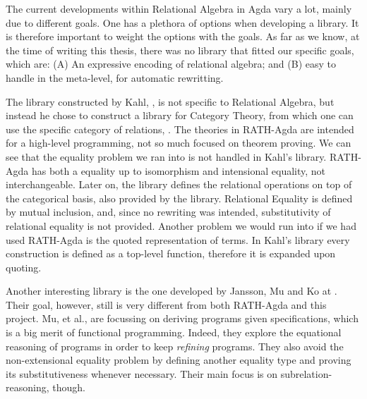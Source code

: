 The current developments within Relational Algebra in Agda vary a lot, mainly due to
different goals. One has a plethora of options when developing a library. It is therefore
important to weight the options with the goals. As far as we know, at the time
of writing this thesis, there was no library that fitted our specific goals, which
are: (A) An expressive encoding of relational algebra; and (B) easy to handle in the meta-level,
for automatic rewritting.

The library constructed by Kahl, \cite{RATHAgda}, is not specific to Relational Algebra, but
instead he chose to construct a library for Category Theory, from which one can use
the specific category of relations, . The theories in RATH-Agda are intended
for a high-level programming, not so much focused on theorem proving. We can see that
the equality problem we ran into is not handled in Kahl's library. RATH-Agda has both a equality up to
isomorphism and intensional equality, not interchangeable. Later on, the library
defines the relational operations on top of the categorical basis, also provided by the library.
Relational Equality is defined by mutual inclusion, and, since no rewriting was intended,
substitutivity of relational equality is not provided. Another problem we would run into
if we had used RATH-Agda is the quoted representation of terms. In Kahl's library every
construction is defined as a top-level function, therefore it is expanded upon quoting. 

Another interesting library is the one developed by Jansson, Mu and Ko at \cite{Jansson09}. 
Their goal, however, still is very different from both RATH-Agda and this project.
Mu, et al., are focussing on deriving programs given specifications, which is a big merit of
functional programming. Indeed, they explore the equational reasoning of programs in order to keep
\emph{refining} programs. They also avoid the non-extensional equality problem by defining
another equality type and proving its substitutiveness whenever necessary. Their main focus
is on subrelation-reasoning, though.
